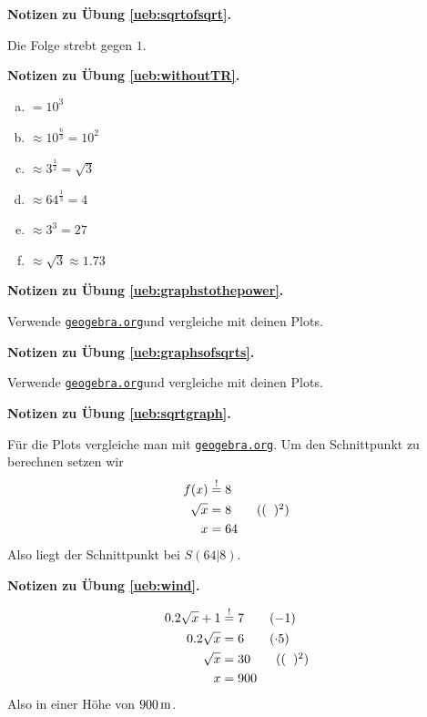 \documentclass[%
11pt,%
twoside,%
titlepage,%
german,%
headsepline%
]{scrartcl}
\newcommand{\geogebralink}{\href{https://www.geogebra.org/calculator}{\texttt{geogebra.org}}}
\newcommand{\concatueb}[1]{ueb:#1}%
\newcommand{\concatlsg}[1]{lsg:#1}%
\newenvironment{lsg}[1]{%
    \par\noindent\textbf{Notizen zu Übung \ref{\concatueb{#1}}.}%
    \label{\concatlsg{#1}}
}{%
    \par%
}
\begin{document}

\begin{lsg}{sqrtofsqrt}
  Die Folge strebt gegen $1$.
\end{lsg}

\begin{lsg}{withoutTR}
  \begin{enumerate}[a)]
    \item $=10^3$
    \item $\approx10^\frac{6}{3}=10^2$
    \item $\approx3^\frac{1}{2}=\sqrt{3}$
    \item $\approx64^\frac{1}{3}=4$
    \item $\approx3^3=27$
    \item $\approx\sqrt{3}\approx1.73$
  \end{enumerate}
\end{lsg}

\begin{lsg}{graphstothepower}
  Verwende \geogebralink und vergleiche mit deinen Plots.
\end{lsg}

\begin{lsg}{graphsofsqrts}
  Verwende \geogebralink und vergleiche mit deinen Plots.
\end{lsg}

\begin{lsg}{sqrtgraph}
  Für die Plots vergleiche man mit \geogebralink. Um den Schnittpunkt zu berechnen setzen wir
  \begin{align*}
    f(x) &\stackrel{!}{=} 8\\
    \sqrt{x} &= 8\tag{$(\phantom{x})^2$}\\
    x &= 64
  \end{align*}
  Also liegt der Schnittpunkt bei $S(64|8)$.
\end{lsg}

\begin{lsg}{wind}
  \begin{align*}
    0.2\sqrt{x}+1 &\stackrel{!}{=} 7\tag{$-1$}\\
    0.2\sqrt{x} &= 6\tag{$\cdot5$}\\
    \sqrt{x} &= 30\tag{$(\phantom{x})^2$}\\
    x &= 900
  \end{align*}
  Also in einer Höhe von $\unit[900]{m}$.
\end{lsg}
\end{document}
